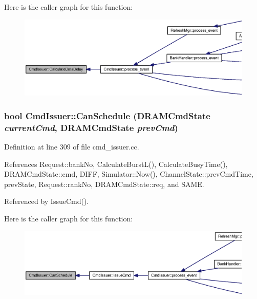 Here is the caller graph for this function:\nopagebreak
\begin{figure}[H]
\begin{center}
\leavevmode
\includegraphics[width=420pt]{classCmdIssuer_4455c4f070b8d8f9e6ae11a1e972b955_icgraph}
\end{center}
\end{figure}
\subsubsection[{CanSchedule}]{\setlength{\rightskip}{0pt plus 5cm}bool CmdIssuer::CanSchedule ({\bf DRAMCmdState} {\em currentCmd}, \/  {\bf DRAMCmdState} {\em prevCmd})}\label{classCmdIssuer_4a1322edbe59ad37ce4cfe32cf42f662}




Definition at line 309 of file cmd\_\-issuer.cc.

References Request::bankNo, CalculateBurstL(), CalculateBusyTime(), DRAMCmdState::cmd, DIFF, Simulator::Now(), ChannelState::prevCmdTime, prevState, Request::rankNo, DRAMCmdState::req, and SAME.

Referenced by IssueCmd().

Here is the caller graph for this function:\nopagebreak
\begin{figure}[H]
\begin{center}
\leavevmode
\includegraphics[width=420pt]{classCmdIssuer_4a1322edbe59ad37ce4cfe32cf42f662_icgraph}
\end{center}
\end{figure}
